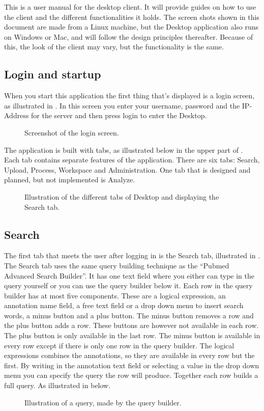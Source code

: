 
This is a user manual for the desktop client. It will provide guides on how to
use the client and the different functionalities it holds. The screen shots
shown in this document are made from a Linux machine, but the Desktop
application also runs on Windows or Mac, and will follow the design principles
thereafter. Because of this, the look of the client may vary, but the
functionality is the same.

\subsection{Login and startup}
When you start this application the first thing that's displayed is a login screen, as illustrated in . In this screen you enter your username, password and the IP-Address for the server and then press login to enter the \appName Desktop.

\begin{figure}[htb]
	\caption{Screenshot of the login screen.}
	\label{fig:des_login-pic}
\end{figure}
The application is built with tabs, as illustrated below in the upper part of . Each tab contains separate features of the application. There are six tabs: Search, Upload, Process, Workspace and Administration. One tab that is designed and planned, but not implemented is Analyze.
\begin{figure}[htb]
	\caption{Illustration of the different tabs of \appName Desktop and displaying the Search tab.}
	\label{fig:des_tabs-view}
\end{figure}
\FloatBarrier

\subsection{Search}
The first tab that meets the user after logging in is the Search tab, illustrated in . The Search tab uses the same query building technique as the “Pubmed Advanced Search Builder”\cite{des_pubmed_query}. It has one text field where you either can type in the query yourself or you can use the query builder below it. Each row in the query builder has at most five components. These are a logical expression, an annotation name field, a free text field or a drop down menu to insert search words, a minus button and a plus button. The minus button removes a row and the plus button adds a row. These buttons are however not available in each row. The plus button is only available in the last row. The minus button is available in every row except if there is only one row in the query builder. The logical expressions combines the annotations, so they are available in every row but the first.
By writing in the annotation text field or selecting a value in the drop down menu you can specify the query the row will produce. Together each row builds a full query. As illustrated in  below.
\begin{figure}[htb]
	\caption{Illustration of a query, made by the query builder.}
	\label{fig:des_search-query}
\end{figure}
\FloatBarrier
